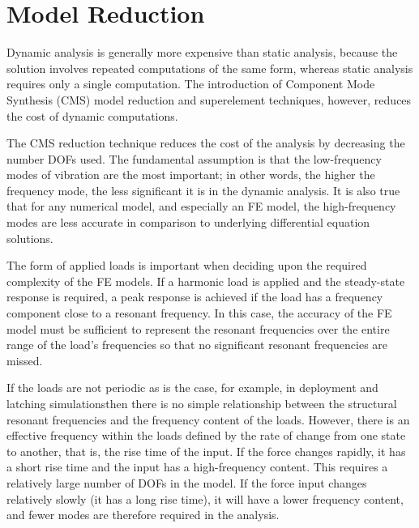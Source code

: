 %
%

%
%

\chapter{Model Reduction}
\label{chap:CMS}

Dynamic analysis is generally more expensive than static analysis, because the solution involves
repeated computations of the same form, whereas static analysis requires only a single computation.
The introduction of Component Mode Synthesis (CMS) model reduction and superelement techniques,
however, reduces the cost of dynamic computations.

The CMS reduction technique reduces the cost of the analysis by decreasing the number DOFs
used. The fundamental assumption is that the low-frequency modes of vibration are the most
important; in other words, the higher the frequency mode, the less significant it is in the
dynamic analysis. It is also true that for any numerical model, and especially an FE model,
the high-frequency modes are less accurate in comparison to underlying differential equation
solutions.

The form of applied loads is important when deciding upon the required complexity of the FE
models. If a harmonic load is applied and the steady-state response is required, a peak response
is achieved if the load has a frequency component close to a resonant frequency. In this case,
the accuracy of the FE model must be sufficient to represent the resonant frequencies over
the entire range of the load's frequencies so that no significant resonant frequencies are
missed.

If the loads are not periodic \mdash{}as is the case, for example, in deployment and latching
simulations\mdash then there is no simple relationship between the structural resonant frequencies
and the frequency content of the loads. However, there is an effective frequency within the
loads defined by the rate of change from one state to another, that is, the rise time of the
input. If the force changes rapidly, it has a short rise time and the input has a high-frequency
content. This requires a relatively large number of DOFs in the model. If the force input changes
relatively slowly (it has a long rise time), it will have a lower frequency content, and fewer
modes are therefore required in the analysis.

